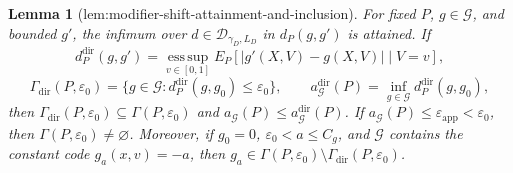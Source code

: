 \documentclass{article}
\newtheorem{lemma}{Lemma}
\begin{document}
\begin{lemma}[lem:modifier-shift-attainment-and-inclusion]\label{lem:modifier-shift-attainment-and-inclusion}
For fixed \(P\), \(g\in\mathcal G\), and bounded \(g'\), the infimum over \(d\in\mathcal D_{\gamma_D,L_D}\) in \(d_P(g,g')\) is attained. If
\[
 d_P^{\mathrm{dir}}(g,g')=\operatorname*{ess\,sup}_{v\in[0,1]}
 E_P[|g'(X,V)-g(X,V)|\mid V=v],
\]
\[
 \Gamma_{\mathrm{dir}}(P,\varepsilon_0)
 =\{g\in\mathcal G:d_P^{\mathrm{dir}}(g,g_0)\le\varepsilon_0\},
 \qquad
 a_{\mathcal G}^{\mathrm{dir}}(P)=\inf_{g\in\mathcal G}d_P^{\mathrm{dir}}(g,g_0),
\]
then \(\Gamma_{\mathrm{dir}}(P,\varepsilon_0)\subseteq\Gamma(P,\varepsilon_0)\) and \(a_{\mathcal G}(P)\le a_{\mathcal G}^{\mathrm{dir}}(P)\). If \(a_{\mathcal G}(P)\le\varepsilon_{\mathrm{app}}<\varepsilon_0\), then \(\Gamma(P,\varepsilon_0)\ne\varnothing\). Moreover, if \(g_0=0\), \(\varepsilon_0<a\le C_g\), and \(\mathcal G\) contains the constant code \(g_a(x,v)=-a\), then \(g_a\in\Gamma(P,\varepsilon_0)\setminus\Gamma_{\mathrm{dir}}(P,\varepsilon_0)\).
\end{lemma}
\end{document}
